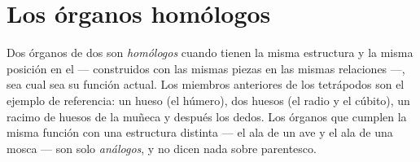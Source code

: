 \section{Los órganos homólogos}

\begin{definition}[Homología]\label{def:g10:common-ancestry:homology}
Dos órganos de dos  son \emph{homólogos}
cuando tienen la misma estructura y la misma posición en el  --- construidos con las mismas piezas en las mismas
relaciones ---, sea cual sea su función actual. Los miembros anteriores
de los tetrápodos son el ejemplo de referencia: un hueso (el húmero),
dos huesos (el radio y el cúbito), un racimo de huesos de la muñeca y
después los dedos. Los órganos que cumplen la misma función con una
estructura distinta --- el ala de un ave y el ala de una mosca --- son
solo \emph{análogos}, y no dicen nada sobre parentesco.
\end{definition}

